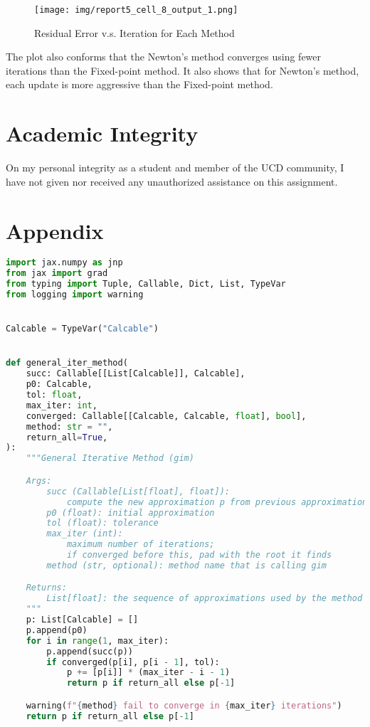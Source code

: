 \documentclass[a4paper,12pt]{article}
\begin{document}
\begin{figure}[H]
    \centering
    \texttt{[image: img/report5\_cell\_8\_output\_1.png]}
    \caption{Residual Error v.s. Iteration for Each Method}
    \label{fig:0}   
\end{figure}

The plot also conforms that the Newton's method converges using fewer iterations than the Fixed-point method.
It also shows that for Newton's method, each update is more aggressive than the Fixed-point method.

\section{Academic Integrity}
On my personal integrity as a student and member of the UCD community, I have not given nor received any unauthorized assistance on this assignment.


\section{Appendix}

\begin{lstlisting}[language=Python, title=\url{numerical_methods/root_finding_1_var.py}]
import jax.numpy as jnp
from jax import grad
from typing import Tuple, Callable, Dict, List, TypeVar
from logging import warning


Calcable = TypeVar("Calcable")


def general_iter_method(
    succ: Callable[[List[Calcable]], Calcable],
    p0: Calcable,
    tol: float,
    max_iter: int,
    converged: Callable[[Calcable, Calcable, float], bool],
    method: str = "",
    return_all=True,
):
    """General Iterative Method (gim)

    Args:
        succ (Callable[List[float], float]):
            compute the new approximation p from previous approximations
        p0 (float): initial approximation
        tol (float): tolerance
        max_iter (int):
            maximum number of iterations;
            if converged before this, pad with the root it finds
        method (str, optional): method name that is calling gim

    Returns:
        List[float]: the sequence of approximations used by the method
    """
    p: List[Calcable] = []
    p.append(p0)
    for i in range(1, max_iter):
        p.append(succ(p))
        if converged(p[i], p[i - 1], tol):
            p += [p[i]] * (max_iter - i - 1)
            return p if return_all else p[-1]

    warning(f"{method} fail to converge in {max_iter} iterations")
    return p if return_all else p[-1]
\end{lstlisting}


\end{document}

